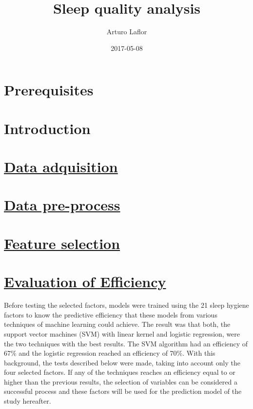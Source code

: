 \documentclass[]{book}
\title{Sleep quality analysis}
\author{Arturo Laflor}
\date{2017-05-08}
\begin{document}
\maketitle

{
\setcounter{tocdepth}{1}
\tableofcontents
}
\chapter{Prerequisites}\label{prerequisites}

\chapter{Introduction}\label{intro}

\hypertarget{data-adquisition}{\chapter{\texorpdfstring{\protect\hyperlink{data-adquisition}{Data
adquisition}}{Data adquisition}}\label{data-adquisition}}

\chapter{\texorpdfstring{\protect\hyperlink{data-preprocess}{Data
pre-process}}{Data pre-process}}\label{data-pre-process}

\hypertarget{feature-selection}{\chapter{\texorpdfstring{\protect\hyperlink{feature-selection}{Feature
selection}}{Feature selection}}\label{feature-selection}}

\chapter{\texorpdfstring{\protect\hyperlink{efficiency-evaluation}{Evaluation
of
Efficiency}}{Evaluation of Efficiency}}\label{evaluation-of-efficiency}

Before testing the selected factors, models were trained using the 21
sleep hygiene factors to know the predictive efficiency that these
models from various techniques of machine learning could achieve. The
result was that both, the support vector machines (SVM) with linear
kernel and logistic regression, were the two techniques with the best
results. The SVM algorithm had an efficiency of 67\% and the logistic
regression reached an efficiency of 70\%. With this background, the
tests described below were made, taking into account only the four
selected factors. If any of the techniques reaches an efficiency equal
to or higher than the previous results, the selection of variables can
be considered a successful process and these factors will be used for
the prediction model of the study hereafter.
\end{document}
